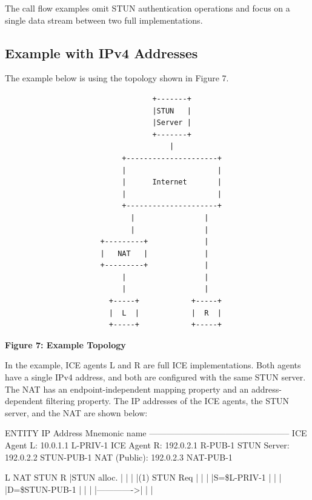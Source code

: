 \documentclass{article}
\begin{document}
The call flow examples omit STUN authentication operations and focus on a single data stream between two full implementations.

\subsection{Example with IPv4 Addresses}

The example below is using the topology shown in Figure 7.

\begin{verbatim}
                                  +-------+
                                  |STUN   |
                                  |Server |
                                  +-------+
                                      |
                           +---------------------+
                           |                     |
                           |      Internet       |
                           |                     |
                           +---------------------+
                             |                |
                             |                |
                      +---------+             |
                      |   NAT   |             |
                      +---------+             |
                           |                  |
                           |                  |
                        +-----+            +-----+
                        |  L  |            |  R  |
                        +-----+            +-----+
\end{verbatim}

\begin{center}
\textbf{Figure 7: Example Topology}
\end{center}

In the example, ICE agents L and R are full ICE implementations. Both agents have a single IPv4 address, and both are configured with the same STUN server.  The NAT has an endpoint-independent mapping property and an address-dependent filtering property.  The IP addresses of the ICE agents, the STUN server, and the NAT are shown below:

ENTITY                   IP Address  Mnemonic name -------------------------------------------------- ICE Agent L:             10.0.1.1    L-PRIV-1 ICE Agent R:             192.0.2.1   R-PUB-1 STUN Server:             192.0.2.2   STUN-PUB-1 NAT (Public):            192.0.2.3   NAT-PUB-1

L             NAT           STUN             R |STUN alloc.   |              |              | |(1) STUN Req  |              |              | |S=\$L-PRIV-1   |              |              | |D=\$STUN-PUB-1 |              |              | |------------->|              |              |
\end{document}
